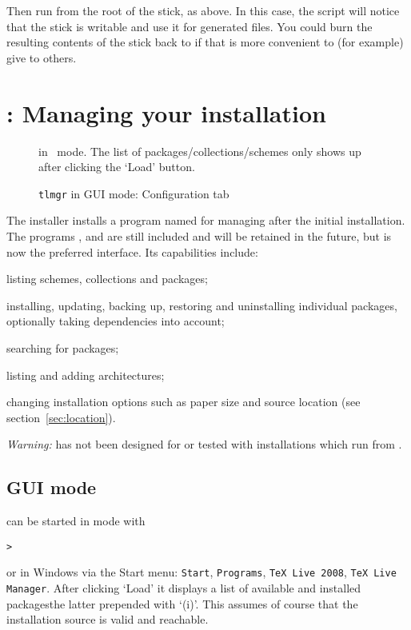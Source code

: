 \documentclass{article}
\begin{document}
Then run  from the root of the stick, as above.
In this case, the script will notice that the stick is writable and use
it for generated files.  You could burn the resulting contents of the
stick back to \DVD{} if that is more convenient to (for example) give to
others.


\section{: Managing your installation}
\label{sec:tlmgr}

\begin{figure}[tb]
\caption{ in \GUI\ mode. The list of
  packages/collections/schemes only shows up after clicking the
  `Load' button.}\label{fig:tlmgr-gui}
\end{figure}

\begin{figure}[tb]
\caption{\texttt{tlmgr} in GUI mode: Configuration tab}\label{fig:tlmgr-config}
\end{figure}

The installer installs a program named  for managing \TL{}
after the initial installation.  The programs ,
 and  are still included and will be
retained in the future, but  is now the preferred interface.
Its capabilities include:

\begin{itemize*}
\item listing schemes, collections and packages;
\item installing, updating, backing up, restoring and uninstalling
  individual packages, optionally taking dependencies into account;
\item searching for packages;
\item listing and adding architectures;
\item changing installation options such as paper size and source
  location (see section~\ref{sec:location}).
\end{itemize*}
\textit{Warning:}  has not been designed for or tested
with installations which run from \DVD.

\subsection{ GUI mode}
 can be started in \GUI{} mode with
\begin{alltt}
> 
\end{alltt}
or in Windows via the Start menu: \texttt{Start}, \texttt{Programs},
\texttt{TeX Live 2008}, \texttt{TeX Live Manager}. After clicking `Load'
it displays a list of available and installed packages\Dash the latter
prepended with `(i)'. This assumes of course that the installation
source is valid and reachable.
\end{document}

